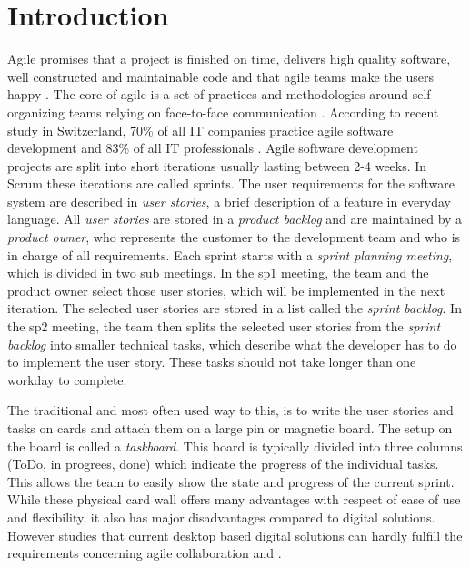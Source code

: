 \documentclass{sigchi}
\begin{document}



\section{Introduction}
Agile promises that a project is finished on time, delivers high quality software, well constructed and maintainable code and that agile teams make the users happy \cite{Stellman:2014}.
The core of agile is a set of practices and methodologies around self-organizing teams relying on face-to-face communication \cite{Cockburn:2001}.
According to recent study in Switzerland, 70\% of all IT companies practice agile software development and 83\% of all IT professionals \cite{Kropp:2015}.
Agile software development projects are split into short iterations usually lasting between 2-4 weeks. In Scrum these iterations are called sprints.
The user requirements for the software system are described in \textit{user stories}, a brief description of a feature in everyday language.
All \textit{user stories} are stored in a \textit{product backlog} and are maintained by a \textit{product owner}, who represents the customer to the development team and who is in charge of all requirements.
Each sprint starts with a \textit{sprint planning meeting}, which is divided in two sub meetings. In the \gls{sp1} meeting, the team and the product owner select those user stories, which will be implemented in the next iteration.
The selected user stories are stored in a list called the \textit{sprint backlog}.
In the \gls{sp2} meeting, the team then splits the selected user stories from the \textit{sprint backlog} into smaller technical tasks, which describe what the developer has to do to implement the user story. These tasks should not take longer than one workday to complete.

The traditional and most often used way to this, is to write the user stories and tasks on cards and attach them on a large pin or magnetic board.
The setup on the board is called a \textit{taskboard}. This board is typically divided into three columns (ToDo, in progrees, done) which indicate the progress of the individual tasks. This allows the team to easily show the state and progress of the current sprint. While these physical card wall offers many advantages with respect of ease of use and flexibility, it also has major disadvantages compared to digital solutions. However studies that current desktop based digital solutions can hardly fulfill the requirements concerning agile collaboration \cite{udcw:31721} and \cite{Mateescu:2015} .
\end{document}
